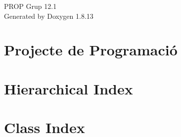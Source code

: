 \documentclass[twoside]{book}
\newcommand{\+}{\discretionary{\mbox{\scriptsize$\hookleftarrow$}}{}{}}
\newcommand{\clearemptydoublepage}{%
  \newpage{\pagestyle{empty}\cleardoublepage}%
}
\begin{document}
\hypersetup{pageanchor=false,
             bookmarksnumbered=true,
             pdfencoding=unicode
            }
\begin{titlepage}
\vspace*{7cm}
\begin{center}%
{\Large P\+R\+OP Grup 12.1 }\\
\vspace*{1cm}
{\large Generated by Doxygen 1.8.13}\\
\end{center}
\end{titlepage}
\clearemptydoublepage
{}
\tableofcontents
\clearemptydoublepage
{}
\hypersetup{pageanchor=true}

\chapter{Projecte de Programació}
\label{index}\hypertarget{index}{}
\chapter{Hierarchical Index}

\chapter{Class Index}

\end{document}
